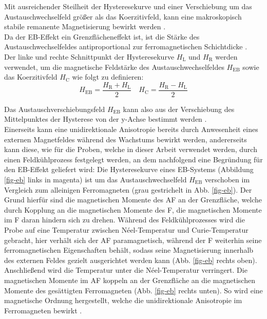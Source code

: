 \documentclass[page,pdftex,12pt,a4paper,twoside,openright]{scrbook}
\begin{document}
Mit ausreichender Steilheit der Hysteresekurve und einer Verschiebung um das Austauschwechselfeld größer als das Koerzitivfeld, kann eine makroskopisch stabile remanente Magnetisierung bewirkt werden \cite{hohler_exchange_2008}.\\

Da der EB-Effekt ein Grenzflächeneffekt ist, ist die Stärke des Austauschwechselfeldes antiproportional zur ferromagnetischen Schichtdicke \cite{hohler_exchange_2008}.\\

Der linke und rechte Schnittpunkt der Hysteresekurve \(H_\mathrm{L}\) und \(H_\mathrm{R}\) werden verwendet, um die magnetische Feldstärke des Austauschwechselfeldes \(H_\mathrm{EB}\) sowie das Koerzitivfeld \(H_\mathrm{C}\) wie folgt zu definieren:\\

\begin{equation}
H_\mathrm{EB} = \frac{H_\mathrm{R}+ H_\mathrm{L}}{2} \quad H_\mathrm{C} = \frac{H_\mathrm{R} - H_\mathrm{L}}{2}
\end{equation}

Das Austauschverschiebungsfeld \(H_\mathrm{EB}\) kann also aus der Verschiebung des Mittelpunktes der Hysterese von der y-Achse bestimmt werden \cite{meiklejohn_new_1957}.\\

Einerseits kann eine unidirektionale Anisotropie bereits durch Anwesenheit eines externen Magnetfeldes während des Wachstums bewirkt werden, andererseits kann diese, wie für die Proben, welche in dieser Arbeit verwendet werden, durch einen Feldkühlprozess festgelegt werden, an dem nachfolgend eine Begründung für den EB-Effekt geliefert wird: Die Hysteresekurve eines EB-Systems (Abbildung \ref{fig-eb} links in magenta) ist um das Austauschwechselfeld \(H_\mathrm{EB}\) verschoben im Vergleich zum alleinigen Ferromagneten (grau gestrichelt in Abb. \ref{fig-eb}). Der Grund hierfür sind die magnetischen Momente des AF an der Grenzfläche, welche durch Kopplung an die magnetischen Momente des F, die magnetischen Momente im F daran hindern sich zu drehen. Während des Feldkühlprozesses wird die Probe auf eine Temperatur zwischen Néel-Temperatur und Curie-Temperatur gebracht, hier verhält sich der AF paramagnetisch, während der F weiterhin seine ferromagnetischen Eigenschaften behält, sodass seine Magnetisierung innerhalb des externen Feldes gezielt ausgerichtet werden kann (Abb. \ref{fig-eb} rechts oben). Anschließend wird die Temperatur unter die Néel-Temperatur verringert. Die magnetischen Momente im AF koppeln an der Grenzfläche an die magnetischen Momente des gesättigten Ferromagneten (Abb. \ref{fig-eb} rechts unten). So wird eine magnetische Ordnung hergestellt, welche die unidirektionale Anisotropie im Ferromagneten bewirkt \cite{merkel_einfluss_2018}.\\
\end{document}
